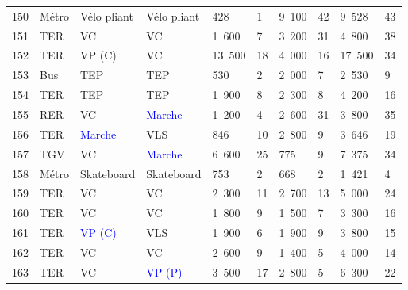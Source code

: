 \begin{longtable}{p{0.7cm}p{1.4cm}p{1.4cm}p{1.6cm}p{0.8cm}p{0.8cm}p{0.8cm}p{0.8cm}p{1.1cm}p{1.1cm}}
    \small{150} & \small{Métro} & \small{Vélo pliant} & \small{Vélo pliant} & \small{428} & \small{1} & \small{9~100} & \small{42} & \small{9~528} & \small{43} \\
    \small{151} & \small{TER} & \small{VC} & \small{VC} & \small{1~600} & \small{7} & \small{3~200} & \small{31} & \small{4~800} & \small{38} \\
    \small{152} & \small{TER} & \small{VP (C)} & \small{VC} & \small{13~500} & \small{18} & \small{4~000} & \small{16} & \small{17~500} & \small{34} \\
    \small{153} & \small{Bus} & \small{TEP} & \small{TEP} & \small{530} & \small{2} & \small{2~000} & \small{7} & \small{2~530} & \small{9} \\
    \small{154} & \small{TER} & \small{TEP} & \small{TEP} & \small{1~900} & \small{8} & \small{2~300} & \small{8} & \small{4~200} & \small{16} \\
    \small{155} & \small{RER} & \small{VC} & \small{\textcolor{blue}{Marche}} & \small{1~200} & \small{4} & \small{2~600} & \small{31} & \small{3~800} & \small{35} \\
    \small{156} & \small{TER} & \small{\textcolor{blue}{Marche}} & \small{VLS} & \small{846} & \small{10} & \small{2~800} & \small{9} & \small{3~646} & \small{19} \\
    \small{157} & \small{TGV} & \small{VC} & \small{\textcolor{blue}{Marche}} & \small{6~600} & \small{25} & \small{775} & \small{9} & \small{7~375} & \small{34} \\
    \small{158} & \small{Métro} & \small{Skateboard} & \small{Skateboard} & \small{753} & \small{2} & \small{668} & \small{2} & \small{1~421} & \small{4} \\
    \small{159} & \small{TER} & \small{VC} & \small{VC} & \small{2~300} & \small{11} & \small{2~700} & \small{13} & \small{5~000} & \small{24} \\
    \small{160} & \small{TER} & \small{VC} & \small{VC} & \small{1~800} & \small{9} & \small{1~500} & \small{7} & \small{3~300} & \small{16} \\
    \small{161} & \small{TER} & \small{\textcolor{blue}{VP (C)}} & \small{VLS} & \small{1~900} & \small{6} & \small{1~900} & \small{9} & \small{3~800} & \small{15}\\
    \small{162} & \small{TER} & \small{VC} & \small{VC} & \small{2~600} & \small{9} & \small{1~400} & \small{5} & \small{4~000} & \small{14}\\
    \small{163} & \small{TER} & \small{VC} & \small{\textcolor{blue}{VP (P)}} & \small{3~500} & \small{17} & \small{2~800} & \small{5} & \small{6~300} & \small{22}\\

\end{longtable}

